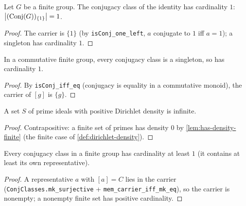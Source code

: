 \begin{lemma}\label{lem:conjclasses-mk-one-carrier-card-one}
  \leanok
  Let $G$ be a finite group. The conjugacy class of the identity has
  cardinality $1$:
  $\left\lvert (\mathrm{Conj}(G))_{\{1\}} \right\rvert = 1$.
\end{lemma}

\begin{proof}\leanok
  The carrier is $\{1\}$ (by \texttt{isConj\_one\_left}, $a$ conjugate to
  $1$ iff $a = 1$); a singleton has cardinality $1$.
\end{proof}

\begin{lemma}\label{lem:conjclasses-carrier-card-one-comm}
  \leanok
  In a commutative finite group, every conjugacy class is a singleton,
  so has cardinality $1$.
\end{lemma}

\begin{proof}\leanok
  By \texttt{isConj\_iff\_eq} (conjugacy is equality in a commutative
  monoid), the carrier of $[g]$ is $\{g\}$.
\end{proof}

\begin{lemma}\label{lem:infinite-of-density-pos}
  A set $S$ of prime ideals with positive Dirichlet density is infinite.
\end{lemma}

\begin{proof}
  Contrapositive: a finite set of primes has density $0$ by
  \cref{lem:has-density-finite} (the finite case of
  \cref{def:dirichlet-density}).
\end{proof}

\begin{lemma}\label{lem:conjclasses-carrier-card-pos}
  \leanok
  Every conjugacy class in a finite group has cardinality at least $1$
  (it contains at least its own representative).
\end{lemma}

\begin{proof}\leanok
  A representative $a$ with $[a] = C$ lies in the carrier
  (\texttt{ConjClasses.mk\_surjective} + \texttt{mem\_carrier\_iff\_mk\_eq}),
  so the carrier is nonempty; a nonempty finite set has positive
  cardinality.
\end{proof}

